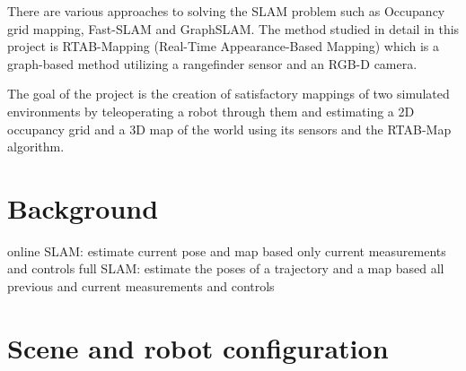 \documentclass[10pt,journal,compsoc]{IEEEtran}
\begin{document}
There are various approaches to solving the SLAM problem such as Occupancy grid mapping, Fast-SLAM and GraphSLAM. The method studied in detail in this project is RTAB-Mapping (Real-Time Appearance-Based Mapping) which is a graph-based method utilizing a rangefinder sensor and an RGB-D camera.

The goal of the project is the creation of satisfactory mappings of two simulated environments by teleoperating a robot through them and estimating a 2D occupancy grid and a 3D map of the world using its sensors and the RTAB-Map algorithm.


\section{Background}

online SLAM: estimate current pose and map based only current measurements and controls
full SLAM: estimate the poses of a trajectory and a map based all previous and current measurements and controls



\section{Scene and robot configuration}
\end{document}
